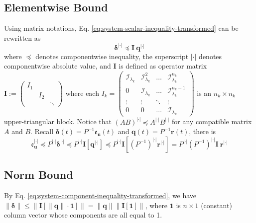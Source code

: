 \documentclass[accepted]{uai2023}
\newcommand{\vect}[1]{\mathbf{#1}}
\newcommand{\Err}{\mathfrak{e}}
\newcommand{\I}{\mathcal{I}}
\newcommand{\abs}{|\cdot|}
\begin{document}
\subsection{Elementwise Bound}
    Using matrix notations, Eq. \ref{eq:system-scalar-inequality-transformed} can be rewritten as
    \begin{equation} \label{eq:system-component-inequality-transformed}
        \pmb{\delta}^{\abs} \preceq \vect{I}\ \vect{q}^{\abs}
    \end{equation}
    where $\preceq$ denotes componentwise inequality, the superscript $\abs$ denotes componentwise absolute value, and $\vect{I}$ is defined as operator matrix $\vect{I} := \begin{pmatrix} I_1 \\ & I_2 \\ && \ddots \end{pmatrix}$ where each $I_k = \begin{pmatrix}
        \I_{\lambda_k} & \I_{\lambda_k}^2 & \dots &\I_{\lambda_k}^{n_k} \\
        0 & \I_{\lambda_k} & \dots &\I_{\lambda_k}^{n_k-1} \\
        \vdots & \vdots & \ddots & \vdots \\
        0 & 0 & \dots & \I_{\lambda_k}
    \end{pmatrix}$ is an $n_k \times n_k$ upper-triangular block.
    Notice that $(AB)^{\abs} \preceq A^{\abs} B^{\abs}$ for any compatible matrix $A$ and $B$. Recall $\pmb{\delta}(t) = P^{-1}\Err_{\vect{u}}(t)$ and $\pmb{q}(t) = P^{-1} \vect{r}(t)$, there is
    \begin{equation}
        \Err_{\vect{u}}^{\abs} 
        \preceq P^{\abs}\pmb{\delta}^{\abs} 
        \preceq P^{\abs} \vect{I} \left[\vect{q}^{\abs} \right]
        \preceq P^{\abs} \vect{I} \left[(P^{-1})^{\abs} \vect{r}^{\abs}\right]
        = P^{\abs} (P^{-1})^{\abs}  \vect{I}\ \vect{r}^{\abs}
    \end{equation}
\subsection{Norm Bound}
    By Eq. \ref{eq:system-component-inequality-transformed}, we have $ \|\pmb{\delta}\| \leq \big\|\vect{I} [\|\vect{q}\| \cdot \vect{1}]\big\| = \|\vect{q}\| \left\|\vect{I}[\vect{1}]\right\|$, where $\vect{1}$ is $n \times 1$ (constant) column vector whose components are all equal to 1.
\end{document}
